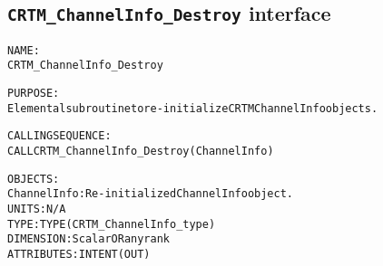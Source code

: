 \subsection{\texttt{CRTM\_ChannelInfo\_Destroy} interface}
  \label{sec:CRTM_ChannelInfo_Destroy_interface}
  \begin{alltt}
 
  NAME:
        CRTM_ChannelInfo_Destroy
 
  PURPOSE:
        Elemental subroutine to re-initialize CRTM ChannelInfo objects.
 
  CALLING SEQUENCE:
        CALL CRTM_ChannelInfo_Destroy( ChannelInfo )
 
  OBJECTS:
        ChannelInfo:    Re-initialized ChannelInfo object.
                        UNITS:      N/A
                        TYPE:       TYPE(CRTM_ChannelInfo_type)
                        DIMENSION:  Scalar OR any rank
                        ATTRIBUTES: INTENT(OUT)
 
  \end{alltt}

